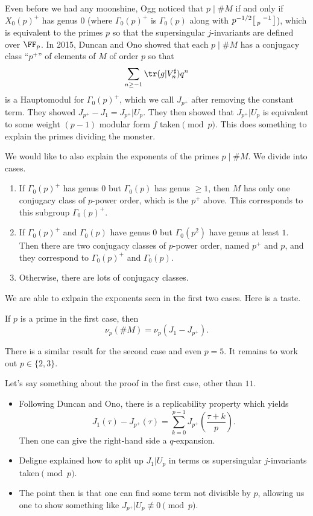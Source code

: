 \documentclass{article}
\begin{document}
Even before we had any moonshine, Ogg noticed that $p\mid\#M$ if and only if $X_0(p)^+$ has genus $0$ (where $\Gamma_0(p)^+$ is $\Gamma_0(p)$ along with $p^{-1/2}\begin{bsmallmatrix}
	& -1 \\ p
\end{bsmallmatrix}$), which is equivalent to the primes $p$ so that the supersingular $j$-invariants are defined over $\FF_p$. In 2015, Duncan and Ono showed that each $p\mid\#M$ has a conjugacy class ``$p^+$'' of elements of $M$ of order $p$ so that
\[\sum_{n\ge-1}\tr(g\vert V_n^\sharp)q^n\]
is a Hauptomodul for $\Gamma_0(p)^+$, which we call $J_{p^+}$ after removing the constant term. They showed $J_{p^+}-J_1=J_{p^+}\vert U_p$. They then showed that $J_{p^+}\vert U_p$ is equivalent to some weight $(p-1)$ modular form $f$ taken$\pmod p$. This does something to explain the primes dividing the monster.

We would like to also explain the exponents of the primes $p\mid\#M$. We divide into cases.
\begin{enumerate}
	\item If $\Gamma_0(p)^+$ has genus $0$ but $\Gamma_0(p)$ has genus $\ge1$, then $M$ has only one conjugacy class of $p$-power order, which is the $p^+$ above. This corresponds to this subgroup $\Gamma_0(p)^+$.
	\item If $\Gamma_0(p)^+$ and $\Gamma_0(p)$ have genus $0$ but $\Gamma_0(p^2)$ have genus at least $1$. Then there are two conjugacy classes of $p$-power order, named $p^+$ and $p$, and they correspond to $\Gamma_0(p)^+$ and $\Gamma_0(p)$.
	\item Otherwise, there are lots of conjugacy classes.
\end{enumerate}
We are able to exlpain the exponents seen in the first two cases. Here is a taste.
\begin{theorem}
	If $p$ is a prime in the first case, then
	\[\nu_p(\#M)=\nu_p(J_1-J_{p^+}).\]
\end{theorem}
There is a similar result for the second case and even $p=5$. It remains to work out $p\in\{2,3\}$.

Let's say something about the proof in the first case, other than $11$.
\begin{itemize}
	\item Following Duncan and Ono, there is a replicability property which yields
	\[J_1(\tau)-J_{p^+}(\tau)=\sum_{k=0}^{p-1}J_{p^+}\left(\frac{\tau+k}p\right).\]
	Then one can give the right-hand side a $q$-expansion.
	\item Deligne explained how to split up $J_1\vert U_p$ in terms os supersingular $j$-invariants taken$\pmod p$.
	\item The point then is that one can find some term not divisible by $p$, allowing us one to show something like $J_{p^+}\vert U_p\not\equiv0\pmod p$.
\end{itemize}
\end{document}
